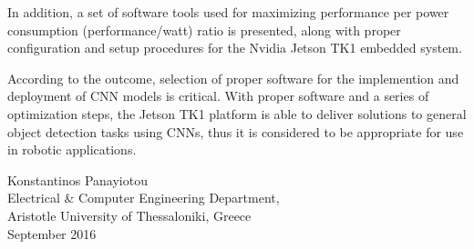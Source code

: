 {In addition, a set of software tools used for maximizing
performance per power consumption (performance/watt) ratio is presented,
along with proper configuration and
setup procedures for the Nvidia Jetson TK1 embedded system.

According to the outcome, selection of proper software for the implemention and
deployment of CNN models is critical. With proper software and a
series of optimization steps, the Jetson TK1 platform is able to
deliver solutions to general object detection tasks using CNNs, thus it
is considered to be appropriate for use in robotic applications.


\begin{flushright}
  \vspace{2cm}
  Konstantinos Panayiotou
  \\
  Electrical \& Computer Engineering Department,
  \\
  Aristotle University of Thessaloniki, Greece
  \\
  September 2016
\end{flushright}

}
